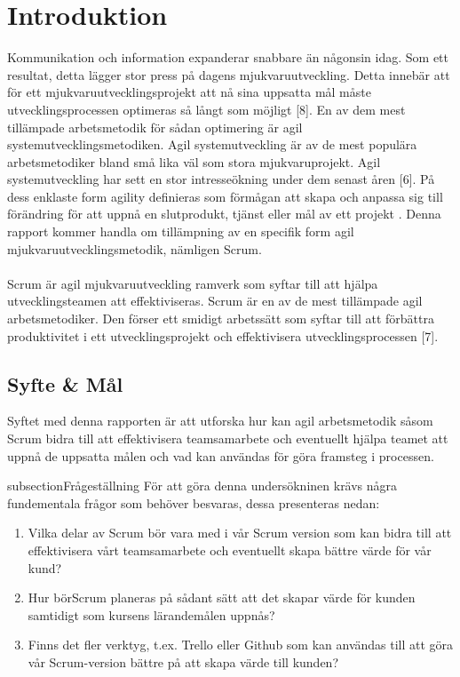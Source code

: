 \section{Introduktion}
\label{sec:Lieth-introduction}

Kommunikation och information expanderar snabbare än någonsin idag. Som ett resultat, detta lägger stor press på dagens mjukvaruutveckling. 
Detta innebär att för ett mjukvaruutvecklingsprojekt att nå sina uppsatta mål måste utvecklingsprocessen optimeras så långt som möjligt [8]. 
En av dem mest tillämpade arbetsmetodik för sådan optimering är agil systemutvecklingsmetodiken. Agil systemutveckling är av de mest populära 
arbetsmetodiker bland små lika väl som stora mjukvaruprojekt. Agil systemutveckling har sett en stor intresseökning under dem senast åren [6]. 
På dess enklaste form agility definieras som förmågan att skapa och anpassa sig till förändring för att uppnå en slutprodukt, tjänst eller mål av 
ett projekt . Denna rapport kommer handla om tillämpning av en specifik form agil mjukvaruutvecklingsmetodik, nämligen Scrum. 
\\
\\ Scrum är agil mjukvaruutveckling ramverk som syftar till att hjälpa utvecklingsteamen att effektiviseras. Scrum är en av de mest tillämpade agil 
arbetsmetodiker. Den förser ett smidigt arbetssätt som syftar till att förbättra produktivitet i ett utvecklingsprojekt och effektivisera utvecklingsprocessen [7].

\subsection{Syfte \& Mål}
\label{subsec:Lieth-aim}
Syftet med denna rapporten är att utforska hur kan agil arbetsmetodik såsom Scrum bidra till att effektivisera teamsamarbete och eventuellt hjälpa teamet att 
uppnå de uppsatta målen och vad kan användas för göra framsteg i processen.


subsection{Frågeställning}
\label{subsec:Lieth-research-questions}
För att göra denna undersökninen krävs några fundementala frågor som behöver besvaras, dessa presenteras nedan:

\begin{enumerate}
	\item Vilka delar av Scrum bör vara med i vår Scrum version som kan bidra till att effektivisera vårt teamsamarbete 
	och eventuellt skapa bättre värde för vår kund?
	\item Hur börScrum planeras på sådant sätt att det skapar värde för kunden samtidigt som kursens lärandemålen uppnås? 
	
	
	\item Finns det fler verktyg, t.ex. Trello eller Github som kan användas till att göra vår  Scrum-version bättre på att skapa värde till kunden? 
	
\end{enumerate}

